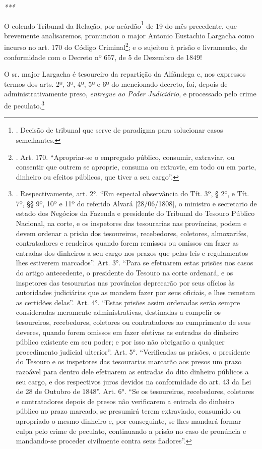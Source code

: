 \emph{***}

O colendo Tribunal da Relação, por acórdão\footnote{. Decisão de
  tribunal que serve de paradigma para solucionar casos semelhantes.} de
19 do mês precedente, que brevemente analisaremos, pronunciou o major
Antonio Eustachio Largacha como incurso no art. 170 do Código
Criminal\footnote{. Art. 170. ``Apropriar-se o empregado público,
  consumir, extraviar, ou consentir que outrem se aproprie, consuma ou
  extravie, em todo ou em parte, dinheiro ou efeitos públicos, que tiver
  a seu cargo''.}; e o sujeitou à prisão e livramento, de conformidade
com o Decreto nº 657, de 5 de Dezembro de 1849!

O sr. major Largacha é tesoureiro da repartição da Alfândega e, nos
expressos termos dos arts. 2º, 3º, 4º, 5º e 6º do mencionado decreto,
foi, depois de administrativamente preso, \emph{entregue ao Poder
Judiciário}, e processado pelo crime de peculato.\footnote{.
  Respectivamente, art. 2°. ``Em especial observância do Tít. 3º, § 2º,
  e Tít. 7º, §§ 9º, 10º e 11º do referido Alvará {[}28/06/1808{]}, o
  ministro e secretario de estado dos Negócios da Fazenda e presidente
  do Tribunal do Tesouro Público Nacional, na corte, e os inspetores das
  tesourarias nas províncias, podem e devem ordenar a prisão dos
  tesoureiros, recebedores, coletores, almoxarifes, contratadores e
  rendeiros quando forem remissos ou omissos em fazer as entradas dos
  dinheiros a seu cargo nos prazos que pelas leis e regulamentos lhes
  estiverem marcados''. Art. 3°. ``Para se efetuarem estas prisões nos
  casos do artigo antecedente, o presidente do Tesouro na corte
  ordenará, e os inspetores das tesourarias nas províncias deprecarão
  por seus ofícios às autoridades judiciárias que as mandem fazer por
  seus oficiais, e lhes remetam as certidões delas''. Art. 4°. ``Estas
  prisões assim ordenadas serão sempre consideradas meramente
  administrativas, destinadas a compelir os tesoureiros, recebedores,
  coletores ou contratadores ao cumprimento de seus deveres, quando
  forem omissos em fazer efetivas as entradas do dinheiro público
  existente em seu poder; e por isso não obrigarão a qualquer
  procedimento judicial ulterior''. Art. 5°. ``Verificadas as prisões, o
  presidente do Tesouro e os inspetores das tesourarias marcarão aos
  presos um prazo razoável para dentro dele efetuarem as entradas do
  dito dinheiro públicos a seu cargo, e dos respectivos juros devidos na
  conformidade do art. 43 da Lei de 28 de Outubro de 1848''. Art. 6°.
  ``Se os tesoureiros, recebedores, coletores e contratadores depois de
  presos não verificarem a entrada do dinheiro público no prazo marcado,
  se presumirá terem extraviado, consumido ou apropriado o mesmo
  dinheiro e, por conseguinte, se lhes mandará formar culpa pelo crime
  de peculato, continuando a prisão no caso de pronúncia e mandando-se
  proceder civilmente contra seus fiadores''.}


